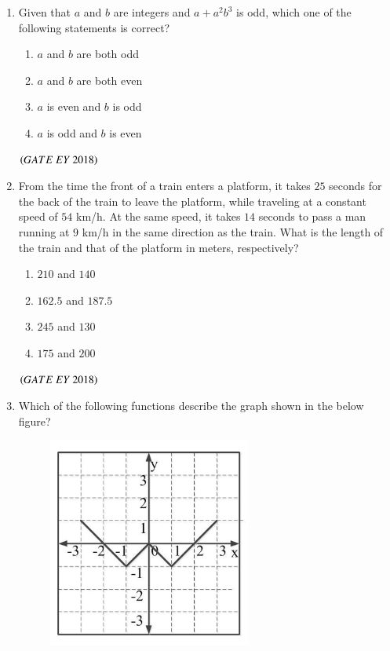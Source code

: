 \documentclass[journal]{IEEEtran}
\numberwithin{equation}{enumi}
\numberwithin{figure}{enumi}
\begin{document}
\begin{enumerate}
\begin{multicols}{4}
\end{multicols}
\hfill{$\brak{ GATE\ EY\ 2018}$}
\bigskip
 \item Given that $a$ and $b$ are integers and $a+a^2b^3$ is odd, which one of the following statements is correct?
\begin{multicols}{2}
\begin{enumerate}
    \item $a$ and $b$ are both odd
    \item $a$ and $b$ are both even
    \item $a$ is even and $b$ is odd
    \item $a$ is odd and $b$ is even
\end{enumerate}
\end{multicols}
\hfill{$\brak{ GATE\ EY\ 2018}$}
\bigskip
\item From the time the front of a train enters a platform, it takes $25$ seconds for the back of the train to leave the platform, while traveling at a constant speed of $54$ km/h. At the same speed, it takes $14$ seconds to pass a man running at $9$ km/h in the same direction as the train. What is the length of the train and that of the platform in meters, respectively?
\begin{multicols}{2}
\begin{enumerate}
    \item $210$ and $140$
    \item $162.5$ and $187.5$
    \item $245$ and $130$
    \item $175$ and $200$
\end{enumerate}
\end{multicols}
\hfill{$\brak{ GATE\ EY\ 2018}$}
\bigskip
\item Which of the following functions describe the graph shown in the below figure?
\begin{figure}[!ht]
    \centering
    \includegraphics[width=0.25\columnwidth]{figs/9.png}
    \caption{}
    \label{fig:9}
   \end{figure}
\begin{multicols}{2}
\begin{enumerate}

\end{enumerate}
\end{multicols}
\end{enumerate}
\end{document}
